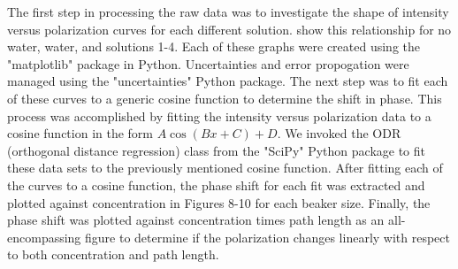 
The first step in processing the raw data was to investigate the shape of intensity versus polarization curves for each different solution.  show this relationship for no water, water, and solutions 1-4. Each of these graphs were created using the "matplotlib" package in Python. Uncertainties and error propogation were managed using the "uncertainties" Python package. 
The next step was to fit each of these curves to a generic cosine function to determine the shift in phase. This process was accomplished by fitting the intensity versus polarization data to a cosine function in the form $A\cos{\left(Bx+C\right)}+D$. We invoked the ODR (orthogonal distance regression) class from the "SciPy" Python package to fit these data sets to the previously mentioned cosine function.
After fitting each of the curves to a cosine function, the phase shift for each fit was extracted and plotted against concentration in Figures 8-10 for each beaker size.
Finally, the phase shift was plotted against concentration times path length as an all-encompassing figure to determine if the polarization changes linearly with respect to both concentration and path length.